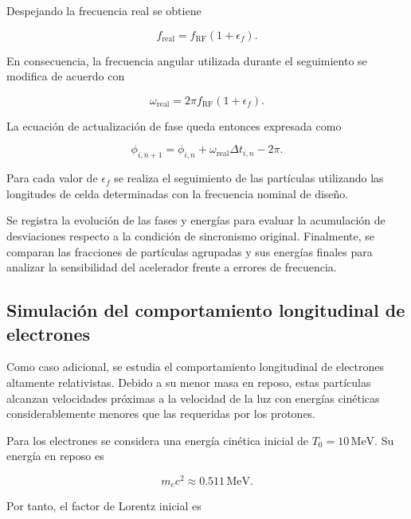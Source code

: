Despejando la frecuencia real se obtiene

\begin{equation}
    f_{\mathrm{real}}
    =
    f_{\mathrm{RF}}(1+\epsilon_f).
\end{equation}

En consecuencia, la frecuencia angular utilizada durante el seguimiento se modifica de acuerdo con

\begin{equation}
    \omega_{\mathrm{real}}
    =
    2\pi f_{\mathrm{RF}}(1+\epsilon_f).
\end{equation}

La ecuación de actualización de fase queda entonces expresada como

\begin{equation}
    \phi_{i,n+1}
    =
    \phi_{i,n}
    +
    \omega_{\mathrm{real}}\Delta t_{i,n}
    -
    2\pi.
\end{equation}

Para cada valor de $\epsilon_f$ se realiza el seguimiento de las partículas utilizando las longitudes de celda determinadas con la frecuencia nominal de diseño.

Se registra la evolución de las fases y energías para evaluar la acumulación de desviaciones respecto a la condición de sincronismo original. Finalmente, se comparan las fracciones de partículas agrupadas y sus energías finales para analizar la sensibilidad del acelerador frente a errores de frecuencia.

\subsection{Simulación del comportamiento longitudinal de electrones}

Como caso adicional, se estudia el comportamiento longitudinal de electrones altamente relativistas. Debido a su menor masa en reposo, estas partículas alcanzan velocidades próximas a la velocidad de la luz con energías cinéticas considerablemente menores que las requeridas por los protones.

Para los electrones se considera una energía cinética inicial de
$T_0=10\,\mathrm{MeV}$. Su energía en reposo es

\begin{equation}
    m_ec^2\approx0.511\,\mathrm{MeV}.
\end{equation}

Por tanto, el factor de Lorentz inicial es


